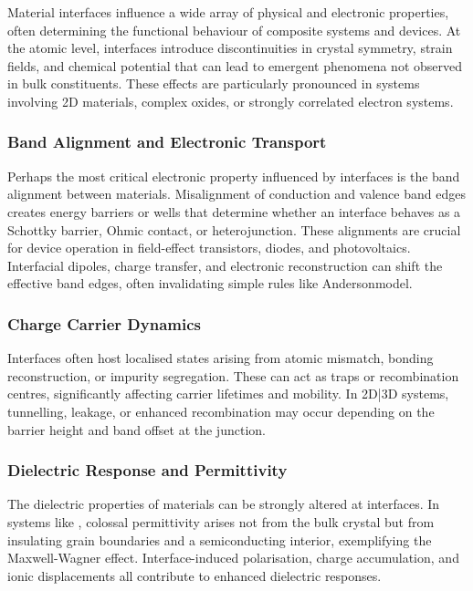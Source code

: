 Material interfaces influence a wide array of physical and electronic properties, often determining the functional behaviour of composite systems and devices. At the atomic level, interfaces introduce discontinuities in crystal symmetry, strain fields, and chemical potential that can lead to emergent phenomena not observed in bulk constituents. These effects are particularly pronounced in systems involving 2D materials, complex oxides, or strongly correlated electron systems.

\subsubsection{Band Alignment and Electronic Transport}

Perhaps the most critical electronic property influenced by interfaces is the band alignment between materials. Misalignment of conduction and valence band edges creates energy barriers or wells that determine whether an interface behaves as a Schottky barrier, Ohmic contact, or heterojunction. These alignments are crucial for device operation in field-effect transistors, diodes, and photovoltaics. Interfacial dipoles, charge transfer, and electronic reconstruction can shift the effective band edges, often invalidating simple rules like Anderson\rqs model.

\subsubsection{Charge Carrier Dynamics}

Interfaces often host localised states arising from atomic mismatch, bonding reconstruction, or impurity segregation. These can act as traps or recombination centres, significantly affecting carrier lifetimes and mobility. In 2D|3D systems, tunnelling, leakage, or enhanced recombination may occur depending on the barrier height and band offset at the junction.

\subsubsection{Dielectric Response and Permittivity}

The dielectric properties of materials can be strongly altered at interfaces. In systems like , colossal permittivity arises not from the bulk crystal but from insulating grain boundaries and a semiconducting interior, exemplifying the Maxwell-Wagner effect. Interface-induced polarisation, charge accumulation, and ionic displacements all contribute to enhanced dielectric responses.

